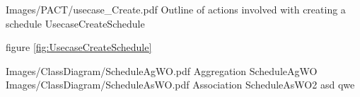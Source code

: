 \begin{BilledeTekst}
{Images/PACT/usecase_Create.pdf}
{Outline of actions involved with creating a schedule}
{UsecaseCreateSchedule}
{\textwidth}
\end{BilledeTekst}

figure \ref{fig:UsecaseCreateSchedule}


\begin{SBSBilledeTekst}
{Images/ClassDiagram/ScheduleAgWO.pdf} %
{Aggregation} %
{ScheduleAgWO} %
{Images/ClassDiagram/ScheduleAsWO.pdf} %
{Association} %
{ScheduleAsWO2} %
{asd} %
{qwe} %
\end{SBSBilledeTekst}





